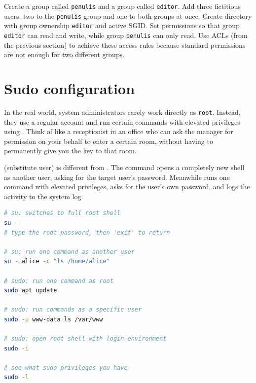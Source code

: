 \begin{challengebox}
Create a group called \texttt{penulis} and a group called \texttt{editor}. Add three fictitious users: two to the \texttt{penulis} group and one to both groups at once. Create directory  with group ownership \texttt{editor} and active SGID. Set permissions so that group \texttt{editor} can read and write, while group \texttt{penulis} can only read. Use ACLs (from the previous section) to achieve these access rules because standard permissions are not enough for two different groups.
\end{challengebox}

\section{Sudo configuration}
\label{sec:sudo-config}

In the real world, system administrators rarely work directly as \texttt{root}. Instead, they use a regular account and run certain commands with elevated privileges using . Think of  like a receptionist in an office who can ask the manager for permission on your behalf to enter a certain room, without having to permanently give you the key to that room.

 (substitute user) is different from . The  command opens a completely new shell as another user, asking for the target user's password. Meanwhile  runs one command with elevated privileges, asks for the user's own password, and logs the activity to the system log.

\begin{lstlisting}[language=bash, caption={Differences in using su and sudo}]
# su: switches to full root shell
su -
# type the root password, then 'exit' to return

# su: run one command as another user
su - alice -c "ls /home/alice"

# sudo: run one command as root
sudo apt update

# sudo: run commands as a specific user
sudo -u www-data ls /var/www

# sudo: open root shell with login environment
sudo -i

# see what sudo privileges you have
sudo -l
\end{lstlisting}

